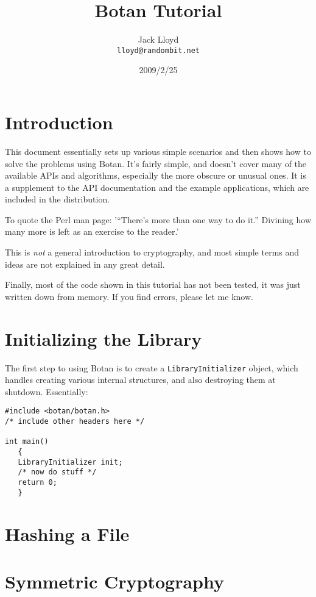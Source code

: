 \documentclass{article}
\title{\textbf{Botan Tutorial}}
\author{Jack Lloyd \\
        \texttt{lloyd@randombit.net}}
\date{2009/2/25}
\newcommand{\type}[1]{\texttt{#1}}
\begin{document}
\maketitle

\tableofcontents

\parskip=5pt
\pagebreak

\section{Introduction}

This document essentially sets up various simple scenarios and then
shows how to solve the problems using Botan. It's fairly simple, and
doesn't cover many of the available APIs and algorithms, especially
the more obscure or unusual ones. It is a supplement to the API
documentation and the example applications, which are included in the
distribution.

To quote the Perl man page: '``There's more than one way to do it.'' Divining
how many more is left as an exercise to the reader.'

This is \emph{not} a general introduction to cryptography, and most simple
terms and ideas are not explained in any great detail.

Finally, most of the code shown in this tutorial has not been tested, it was
just written down from memory. If you find errors, please let me know.

\section{Initializing the Library}

The first step to using Botan is to create a \type{LibraryInitializer} object,
which handles creating various internal structures, and also destroying them at
shutdown. Essentially:

\begin{verbatim}
#include <botan/botan.h>
/* include other headers here */

int main()
   {
   LibraryInitializer init;
   /* now do stuff */
   return 0;
   }
\end{verbatim}

\section{Hashing a File}



\section{Symmetric Cryptography}
\end{document}
